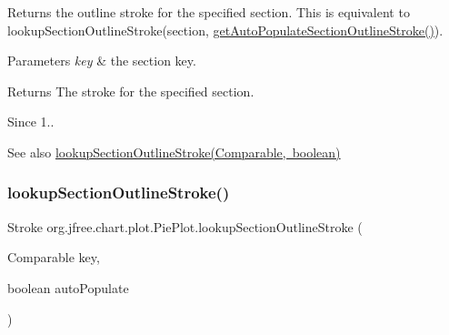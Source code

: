 Returns the outline stroke for the specified section. This is equivalent to {\ttfamily lookup\+Section\+Outline\+Stroke(section, \mbox{\hyperlink{classorg_1_1jfree_1_1chart_1_1plot_1_1_pie_plot_af633b0190782af18b42096b840906423}{get\+Auto\+Populate\+Section\+Outline\+Stroke()}})}.


\begin{DoxyParams}{Parameters}
{\em key} & the section key.\\
\hline
\end{DoxyParams}
\begin{DoxyReturn}{Returns}
The stroke for the specified section.
\end{DoxyReturn}
\begin{DoxySince}{Since}
1..
\end{DoxySince}
\begin{DoxySeeAlso}{See also}
\mbox{\hyperlink{classorg_1_1jfree_1_1chart_1_1plot_1_1_pie_plot_a91ad548495d40424393ffb1072a3c958}{lookup\+Section\+Outline\+Stroke(\+Comparable, boolean)}} 
\end{DoxySeeAlso}
\mbox{\label{classorg_1_1jfree_1_1chart_1_1plot_1_1_pie_plot_a91ad548495d40424393ffb1072a3c958}} 
\subsubsection{\texorpdfstring{lookup\+Section\+Outline\+Stroke()}{lookupSectionOutlineStroke()}\hspace{0.1cm}{\footnotesize\ttfamily [2/2]}}
{\footnotesize\ttfamily Stroke org.\+jfree.\+chart.\+plot.\+Pie\+Plot.\+lookup\+Section\+Outline\+Stroke (\begin{DoxyParamCaption}\item[{Comparable}]{key,  }\item[{boolean}]{auto\+Populate }\end{DoxyParamCaption})\hspace{0.3cm}{\ttfamily [protected]}}

